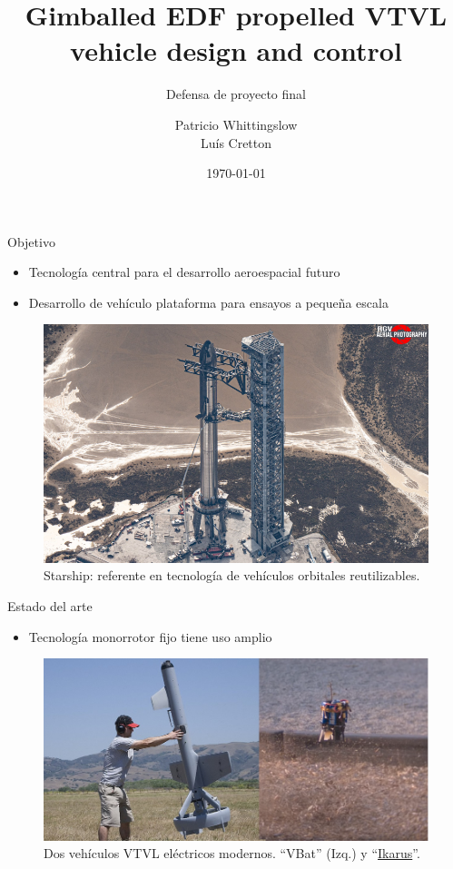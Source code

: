 \documentclass[10pt]{beamer}
\title{Gimballed EDF propelled VTVL \\ 
vehicle design and control}
\subtitle{Defensa de proyecto final}
\date{\today}
\author{Patricio Whittingslow \\ Luís Cretton}
\begin{document}
\maketitle

\begin{frame}{Objetivo}
    \begin{itemize}
        \item Tecnología central para el desarrollo aeroespacial futuro
        \item Desarrollo de vehículo plataforma para ensayos a pequeña escala
    \end{itemize}

    \hspace{0.7cm}
    \begin{figure}[htb]
        \centering
        \includegraphics[width=0.6\linewidth]{fig/starship.png}
        \caption{Starship: referente en tecnología de vehículos orbitales reutilizables.}
        \label{fig:starship}
    \end{figure}
\end{frame}

\begin{frame}{Estado del arte}
    \begin{itemize}
        \item Tecnología monorrotor fijo tiene uso amplio
    \end{itemize}

    \begin{figure}[htb]
        \centering
        \includegraphics[width=0.8\linewidth]{fig/vbat_icarus.png}
        \caption{Dos vehículos VTVL eléctricos modernos. ``VBat'' (Izq.) y ``\href{https://hackaday.com/2018/08/31/single-rotor-drone-a-thrust-vectoring-monocopter/}{Ikarus}''.}
        \label{fig:vbat_icarus}
    \end{figure}
\end{frame}
\end{document}
